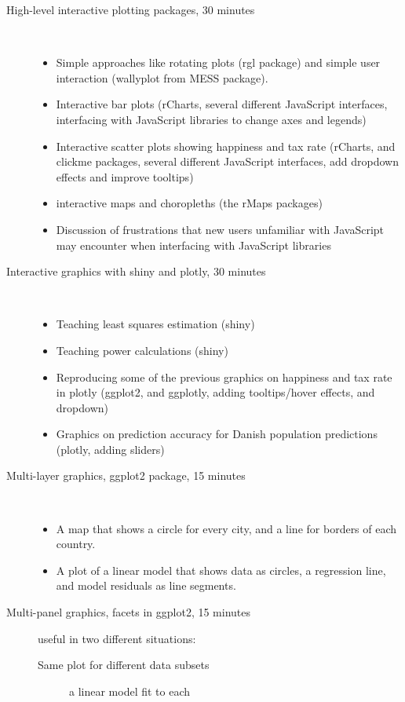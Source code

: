 \documentclass[11pt]{article}
\begin{document}
\begin{description}
\item[{High-level interactive plotting packages, 30 minutes}] \mbox{ }

\begin{itemize}
\item Simple approaches like rotating plots (rgl package) and simple user
interaction (wallyplot from MESS package).
\item Interactive bar plots (rCharts, several different JavaScript
interfaces, interfacing with JavaScript libraries to change axes
and legends)
\item Interactive scatter plots showing happiness and tax rate (rCharts,
and clickme packages, several different JavaScript interfaces, add
dropdown effects and improve tooltips)
\item interactive maps and choropleths (the rMaps packages)
\item Discussion of frustrations that new users unfamiliar with
JavaScript may encounter when interfacing with JavaScript libraries
\end{itemize}
\item[{Interactive graphics with shiny and plotly, 30 minutes}] \mbox{ }
\begin{itemize}
\item Teaching least squares estimation (shiny)
\item Teaching power calculations (shiny)
\item Reproducing some of the previous graphics on happiness and tax
rate in plotly (ggplot2, and ggplotly, adding tooltips/hover
effects, and dropdown)
\item Graphics on prediction accuracy for Danish population predictions
(plotly, adding sliders)
\end{itemize}
\item[{Multi-layer graphics, ggplot2 package, 15 minutes}] \mbox{ }
\begin{itemize}
\item A map that shows a circle for every city, and a line for borders of
each country.
\item A plot of a linear model that shows data as circles, a regression
line, and model residuals as line segments.
\end{itemize}
\item[{Multi-panel graphics, facets in ggplot2, 15 minutes}] useful in two
different situations:
\begin{description}
\item[{Same plot for different data subsets}] a linear model fit to each

\end{description}
\end{description}
\end{document}
